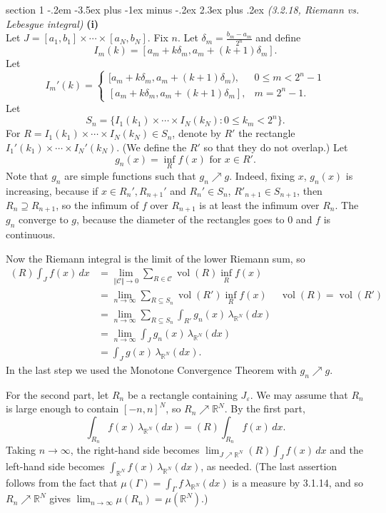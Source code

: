 \documentclass[12pt]{article}
\makeatletter
\theoremstyle{norm}
\newcommand{\R}[0]{\mathbb{R}}
\providecommand{\cal}[1]{\mathcal{#1}}
\renewcommand{\cal}[1]{\mathcal{#1}}
\newcommand{\subeq}[0]{\subseteq}
\newcommand{\supeq}[0]{\supseteq}
\newcommand{\Ga}[0]{\Gamma}
\newcommand{\de}[0]{\delta}
\newcommand{\ep}[0]{\varepsilon}
\newcommand{\la}[0]{\lambda}
\newcommand{\subprob}[1]{\noindent\textbf{#1}\\}
\newcommand{\vol}[0]{\operatorname{vol}}
\newcommand{\iy}[0]{\infty}
\newenvironment{problem}{\@startsection
       {section}
       {1}
       {-.2em}
       {-3.5ex plus -1ex minus -.2ex}
       {2.3ex plus .2ex}
       {\pagebreak[3]%
       \large\bf\noindent{Problem }
       }
       }
       {%
       }
\makeatother
\begin{document}
\begin{problem}{\it(3.2.18, Riemann vs. Lebesgue integral)}
\subprob{(i)}
Let $J=[a_1,b_1]\times \cdots \times [a_N,b_N]$. 
Fix $n$. Let $\de_m=\frac{b_m-a_m}{2^n}$ and define
\[
I_m(k)=[a_m+k\de_m,a_m+(k+1)\de_m].
\]
Let
\[
I_m'(k)=\begin{cases} [a_m+k\de_m,a_m+(k+1)\de_m),&0\le m< 2^n-1\\
[a_m+k\de_m,a_m+(k+1)\de_m],&m= 2^n-1.\end{cases}
\]
Let
\[
S_n=\{I_1(k_1)\times \cdots \times I_N(k_N):0\le k_m<2^n\}.
\]
For $R=I_1(k_1)\times \cdots \times I_N(k_N)\in S_n$, denote by $R'$ the rectangle $I_1'(k_1)\times \cdots \times I_N'(k_N)$. (We define the $R'$ so that they do not overlap.)
Let
\[g_n(x)=\inf_R f(x)\text{ for }x\in R'.\]
Note that $g_n$ are simple functions such that $g_n\nearrow g$. Indeed, fixing $x$, $g_n(x)$ is increasing, because 
if $x\in R_n',R_{n+1}'$ and $R_n'\in S_n$, $R'_{n+1}\in S_{n+1}$, then 
$R_n\supeq R_{n+1}$, so
the infimum of $f$ over $R_{n+1}$ is at least the infimum over $R_n$. The $g_n$ converge to $g$, because the diameter of the rectangles goes to 0 and $f$ is continuous.

Now the Riemann integral is the limit of the lower Riemann sum, so
\begin{align*}
(R)\int_J f(x)\,dx&=\lim_{\Vert \cal C\Vert\to 0} \sum_{R\in \cal C}\vol(R)\inf_R f(x)\\
&=\lim_{n\to \iy}\sum_{R\subeq S_n} \vol(R')\inf_R f(x)&\vol(R)=\vol(R')\\
&=\lim_{n\to \iy}\sum_{R\subeq S_n} \int_{R'} g_n(x)\,\la_{\R^N}(dx)\\
&=\lim_{n\to \iy}\int_J g_n(x)\,\la_{\R^N}(dx)\\
&=\int_J g(x)\,\la_{\R^N}(dx).
\end{align*}
In the last step we used the Monotone Convergence Theorem with $g_n\nearrow g$.

For the second part, let $R_n$ be a rectangle containing $J_{\ep}$. We may assume that $R_n$ is large enough to contain $[-n,n]^N$, so $R_n\nearrow \R^N$. By the first part,
\[
\int_{R_n} f(x)\,\la_{\R^N}(dx)=(R)\int_{R_n} f(x)\,dx.
\]
Taking $n\to \iy$, the right-hand side becomes $\lim_{J\nearrow \R^N} (R)\int_J f(x)\,dx$ and the left-hand side becomes $\int_{\R^N} f(x)\,\la_{\R^N}(dx)$, as needed. (The last assertion follows from the fact that $\mu(\Ga)=\int_{\Ga}f\,\la_{\R^N}(dx)$ is a measure by 3.1.14, and so $R_n\nearrow \R^N$ gives $\lim_{n\to \iy} \mu(R_n)=\mu(\R^N)$.)\\


\end{problem}
\end{document}
